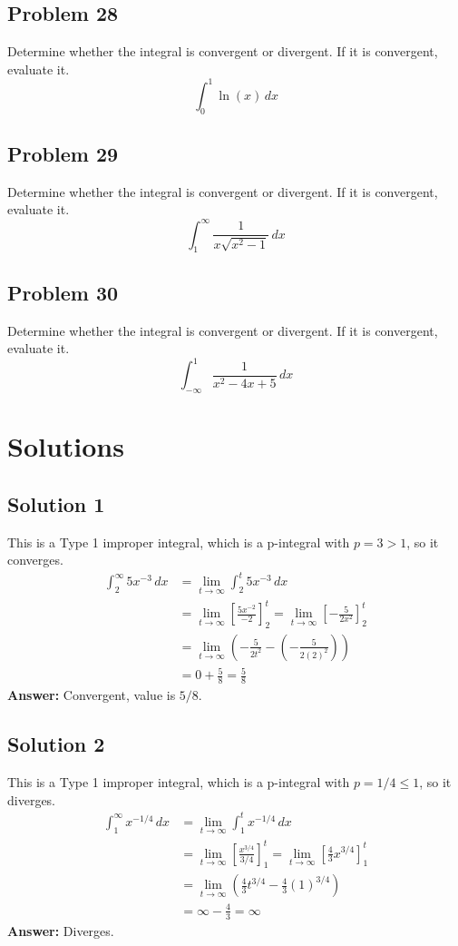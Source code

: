 \documentclass{article}
\begin{document}
\subsection*{Problem 28}
Determine whether the integral is convergent or divergent. If it is convergent, evaluate it.
\[ \int_{0}^{1} \ln(x) \,dx \]

\subsection*{Problem 29}
Determine whether the integral is convergent or divergent. If it is convergent, evaluate it.
\[ \int_{1}^{\infty} \frac{1}{x\sqrt{x^2-1}} \,dx \]

\subsection*{Problem 30}
Determine whether the integral is convergent or divergent. If it is convergent, evaluate it.
\[ \int_{-\infty}^{1} \frac{1}{x^2-4x+5} \,dx \]

\section*{Solutions}

\subsection*{Solution 1}
This is a Type 1 improper integral, which is a p-integral with $p=3 > 1$, so it converges.
\begin{align*}
\int_{2}^{\infty} 5x^{-3} \,dx &= \lim_{t \to \infty} \int_{2}^{t} 5x^{-3} \,dx \\
&= \lim_{t \to \infty} \left[ \frac{5x^{-2}}{-2} \right]_{2}^{t} = \lim_{t \to \infty} \left[ -\frac{5}{2x^2} \right]_{2}^{t} \\
&= \lim_{t \to \infty} \left( -\frac{5}{2t^2} - \left(-\frac{5}{2(2)^2}\right) \right) \\
&= 0 + \frac{5}{8} = \frac{5}{8}
\end{align*}
\textbf{Answer:} Convergent, value is $5/8$.

\subsection*{Solution 2}
This is a Type 1 improper integral, which is a p-integral with $p=1/4 \le 1$, so it diverges.
\begin{align*}
\int_{1}^{\infty} x^{-1/4} \,dx &= \lim_{t \to \infty} \int_{1}^{t} x^{-1/4} \,dx \\
&= \lim_{t \to \infty} \left[ \frac{x^{3/4}}{3/4} \right]_{1}^{t} = \lim_{t \to \infty} \left[ \frac{4}{3}x^{3/4} \right]_{1}^{t} \\
&= \lim_{t \to \infty} \left( \frac{4}{3}t^{3/4} - \frac{4}{3}(1)^{3/4} \right) \\
&= \infty - \frac{4}{3} = \infty
\end{align*}
\textbf{Answer:} Diverges.
\end{document}
